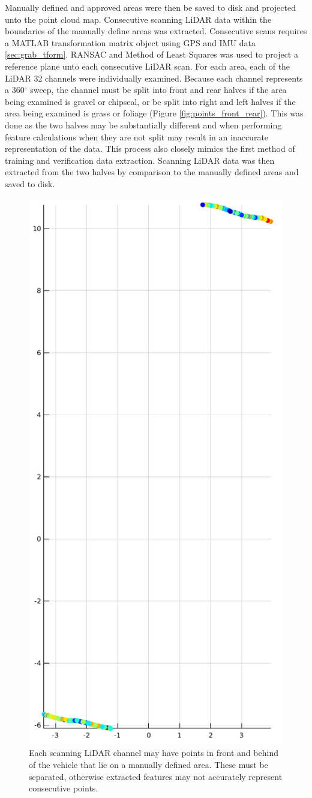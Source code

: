\documentclass[numbered,pdftex]{ohio-etd}
\begin{document}
{{{{				{}	
				
				{Manually defined and approved areas were then be saved to disk and projected unto the point cloud map. Consecutive scanning LiDAR data within the boundaries of the manually define areas was extracted. Consecutive scans requires a MATLAB transformation matrix object using GPS and IMU data \ref{sec:grab_tform}. RANSAC and Method of Least Squares was used to project a reference plane unto each consecutive LiDAR scan. For each area, each of the LiDAR 32 channels were individually examined. Because each channel represents a 360$^\circ$ sweep, the channel must be split into front and rear halves if the area being examined is gravel or chipseal, or be split into right and left halves if the area being examined is grass or foliage (Figure \ref{fig:points_front_rear}). This was done as the two halves may be substantially different and when performing feature calculations when they are not split may result in an inaccurate representation of the data. This process also closely mimics the first method of training and verification data extraction. Scanning LiDAR data was then extracted from the two halves by comparison to the manually defined areas and saved to disk.}

				\begin{figure}[H]
					\centering
					\includegraphics[width=0.5\linewidth]{Defense_Images/both_front_rear}
					\caption[Front and Rear Points]{Each scanning LiDAR channel may have points in front and behind of the vehicle that lie on a manually defined area. These must be separated, otherwise extracted features may not accurately represent consecutive points. }
					\label{fig:both_front_rear}
				\end{figure}				
				
}}}}
\end{document}
